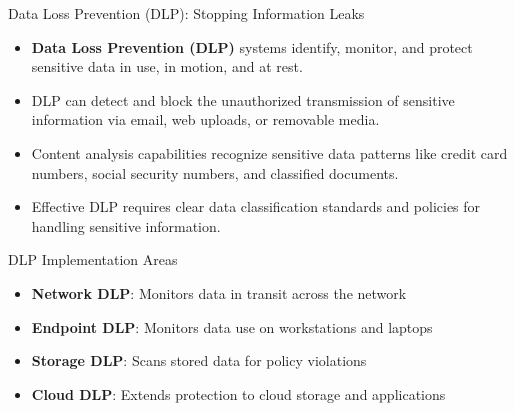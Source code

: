 \documentclass{beamer}
\begin{document}
                    \begin{frame}{Data Loss Prevention (DLP): Stopping Information Leaks}
                        \begin{itemize}
                            \item \textbf{Data Loss Prevention (DLP)} systems identify, monitor, and protect sensitive data in use, in motion, and at rest.
                            \item DLP can detect and block the unauthorized transmission of sensitive information via email, web uploads, or removable media.
                            \item Content analysis capabilities recognize sensitive data patterns like credit card numbers, social security numbers, and classified documents.
                            \item Effective DLP requires clear data classification standards and policies for handling sensitive information.
                        \end{itemize}
                        
                        \begin{block}{DLP Implementation Areas}
                        \begin{itemize}
                            \item \textbf{Network DLP}: Monitors data in transit across the network
                            \item \textbf{Endpoint DLP}: Monitors data use on workstations and laptops
                            \item \textbf{Storage DLP}: Scans stored data for policy violations
                            \item \textbf{Cloud DLP}: Extends protection to cloud storage and applications
                        \end{itemize}
                        \end{block}
                        \end{frame}
                        
\end{document}
